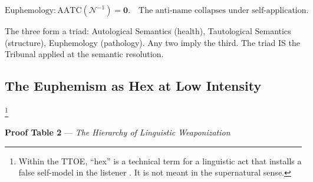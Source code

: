 \documentclass[11pt, oneside]{article}
\theoremstyle{definition}
\begin{document}
$$\boxed{\text{Euphemology}: \text{AATC}(\mathcal{N}^{-1}) = \mathbf{0}. \quad \text{The anti-name collapses under self-application.}}$$

The three form a triad: Autological Semantics (health), Tautological Semantics (structure), Euphemology (pathology). Any two imply the third. The triad IS the Tribunal applied at the semantic resolution.

\subsection{The Euphemism as Hex at Low Intensity}\footnote{Within the TTOE, ``hex'' is a technical term for a linguistic act that installs a false self-model in the listener \cite{codex2}. It is not meant in the supernatural sense.}

\textbf{Proof Table 2} --- \textit{The Hierarchy of Linguistic Weaponization}
\end{document}
